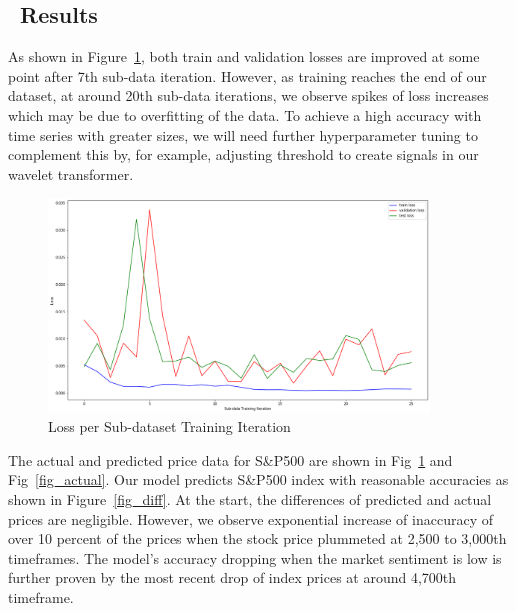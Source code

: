 

\subsection{\scheme\ Results}
\label{sec-effectiveness}
As shown in Figure~\ref{fig_loss}, both train and validation losses are improved at some point after 7th sub-data iteration. However, as training reaches the end of our dataset, at around 20th sub-data iterations, we observe spikes of loss increases which may be due to overfitting of the data. To achieve a high accuracy with time series with greater sizes, we will need further hyperparameter tuning to complement this by, for example, adjusting threshold to create signals in our wavelet transformer. 



\begin{figure}[htpb]
\begin{center}
\includegraphics[width=0.9\textwidth]{./figs/lossvsiter}
\vspace{-0.2cm}
\caption{Loss per Sub-dataset Training Iteration}
\label{fig_loss}
\end{center}
\vspace{-0.4cm}
\end{figure}

The actual and predicted price data for S\&P500 are shown in Fig~\ref{fig_loss} and Fig~\ref{fig_actual}. Our model predicts S\&P500 index with reasonable accuracies as shown in Figure~\ref{fig_diff}. At the start, the differences of predicted and actual prices are negligible. However, we observe exponential increase of inaccuracy of over 10 percent of the prices when the stock price plummeted at 2,500 to 3,000th timeframes. The model’s accuracy dropping when the market sentiment is low is further proven by the most recent drop of index prices at around 4,700th timeframe. 

